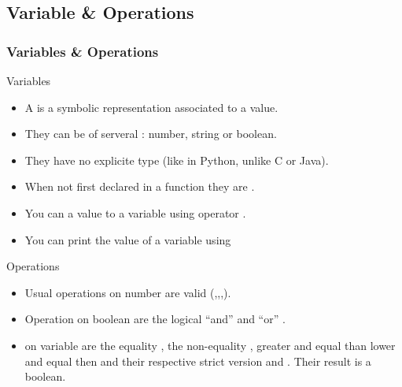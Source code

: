 \subsection{Variable \& Operations}
\begin{frame}
  \frametitle<presentation>{Variables \& Operations}
  \begin{block}{Variables}
    \begin{itemize}
    \item A  is a symbolic representation associated to a value.
    \item They can be of serveral : number, string or boolean.
    \item They have no explicite type (like in Python, unlike C or Java).
    \item When not first declared in a function they are .
    \item You can  a value to a variable using operator \code{=}.
    \item You can print the value of a variable using 
    \end{itemize}
  \end{block}
  \begin{block}{Operations}
    \begin{itemize}
    \item Usual operations on number are valid (\code{+},\code{-},\code{*},\code{/}).
    \item Operation on boolean are the logical ``and'' \code{\&\&} and ``or''  \code{||}.
    \item {} on variable are the equality \code{==},
      the non-equality \code{!=}, greater and equal than \code{>=}
      lower and equal then \code{<=} and their respective strict
      version \code{>} and \code{<}. Their result is a boolean.
    \end{itemize}
  \end{block}
\end{frame}

\begin{frame}
  \begin{example}~\par
    
  \end{example}
\end{frame}

